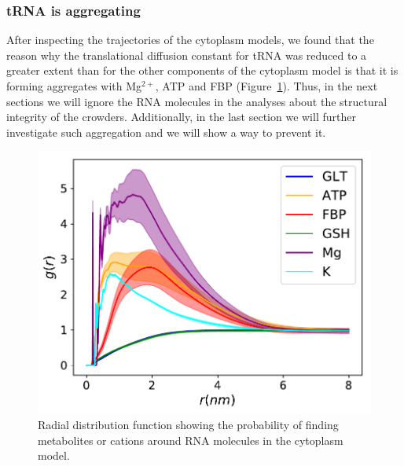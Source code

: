 \documentclass[journal=jacsat,manuscript=article]{achemso}
\begin{document}

\subsubsection{tRNA is aggregating}
After inspecting the trajectories of the cytoplasm models, we found that the reason why the translational diffusion constant for tRNA was reduced to a greater extent than for the other components of the cytoplasm model is that it is forming aggregates with Mg$^{2+}$, ATP and FBP (Figure~\ref{fig:tRNA_aggregation}). Thus, in the next sections we will ignore the RNA molecules in the analyses about the structural integrity of the crowders. Additionally, in the last section we will further investigate such aggregation and we will show a way to prevent it.

\begin{figure}[H]
\includegraphics[scale=0.5]{rdf_RNA_metabolites.pdf}
\caption{Radial distribution function showing the probability of finding metabolites or cations around RNA molecules in the cytoplasm model.}
\label{fig:tRNA_aggregation}
\end{figure}



\end{document}
